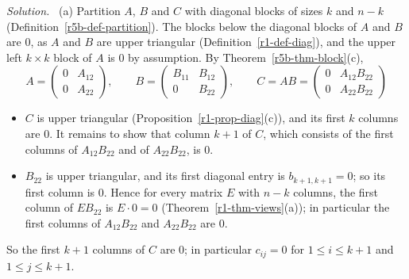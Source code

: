 \documentclass[12pt]{article}
\theoremstyle{definition}
\newenvironment{solution}{\par\noindent\textit{Solution.}\ }{\par\smallskip}
\begin{document}
\begin{solution}
(a) Partition \(A\), \(B\) and \(C\) with diagonal blocks of sizes \(k\) and \(n-k\) (Definition~\ref{r5b-def-partition}).
The blocks below the diagonal blocks of \(A\) and \(B\) are \(0\), as \(A\) and \(B\) are upper triangular
(Definition~\ref{r1-def-diag}), and the upper left \(k\times k\) block of \(A\) is \(0\) by assumption. By
Theorem~\ref{r5b-thm-block}(c),
\[
A=\begin{pmatrix}0&A_{12}\\0&A_{22}\end{pmatrix},\qquad B=\begin{pmatrix}B_{11}&B_{12}\\0&B_{22}\end{pmatrix},\qquad
C=AB=\begin{pmatrix}0&A_{12}B_{22}\\0&A_{22}B_{22}\end{pmatrix}
\]
\begin{itemize}
\item \(C\) is upper triangular (Proposition~\ref{r1-prop-diag}(c)), and its first \(k\) columns are \(0\). It remains to
show that column \(k+1\) of \(C\), which consists of the first columns of \(A_{12}B_{22}\) and of \(A_{22}B_{22}\), is
\(0\).
\item \(B_{22}\) is upper triangular, and its first diagonal entry is \(b_{k+1,k+1}=0\); so its first column is \(0\).
Hence for every matrix \(E\) with \(n-k\) columns, the first column of \(EB_{22}\) is \(E\cdot0=0\)
(Theorem~\ref{r1-thm-views}(a)); in particular the first columns of \(A_{12}B_{22}\) and \(A_{22}B_{22}\) are \(0\).
\end{itemize}
So the first \(k+1\) columns of \(C\) are \(0\); in particular \(c_{ij}=0\) for \(1\leqslant i\leqslant k+1\) and
\(1\leqslant j\leqslant k+1\).


\end{solution}
\end{document}
